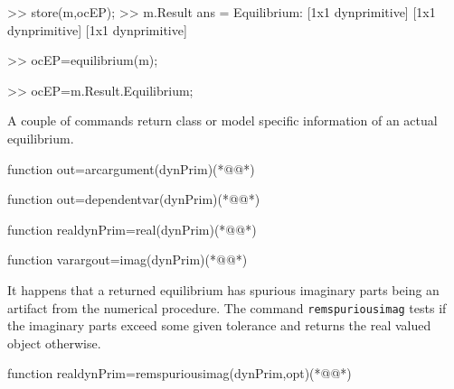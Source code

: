 \begin{matlab}
>> store(m,ocEP);
>> m.Result
ans = 
    Equilibrium: {[1x1 dynprimitive]  [1x1 dynprimitive]  [1x1 dynprimitive]}

>> ocEP=equilibrium(m);

>> ocEP=m.Result.Equilibrium;
\end{matlab}
A couple of commands return class or model specific information of an actual equilibrium.
\begin{matlab}
function out=arcargument(dynPrim)(*@@*)
%
%
\end{matlab}
\begin{matlab}
function out=dependentvar(dynPrim)(*@@*)
%
%
\end{matlab}
\begin{matlab}
function realdynPrim=real(dynPrim)(*@@*)
%
%
\end{matlab}
\begin{matlab}
function varargout=imag(dynPrim)(*@@*)
%
%
\end{matlab}
It happens that a returned equilibrium has spurious imaginary parts being an artifact from the numerical procedure. The command \lstinline+remspuriousimag+ tests if the imaginary parts exceed some given tolerance and returns the real valued object otherwise.
\begin{matlab}
function realdynPrim=remspuriousimag(dynPrim,opt)(*@@*)
%
%
\end{matlab}
